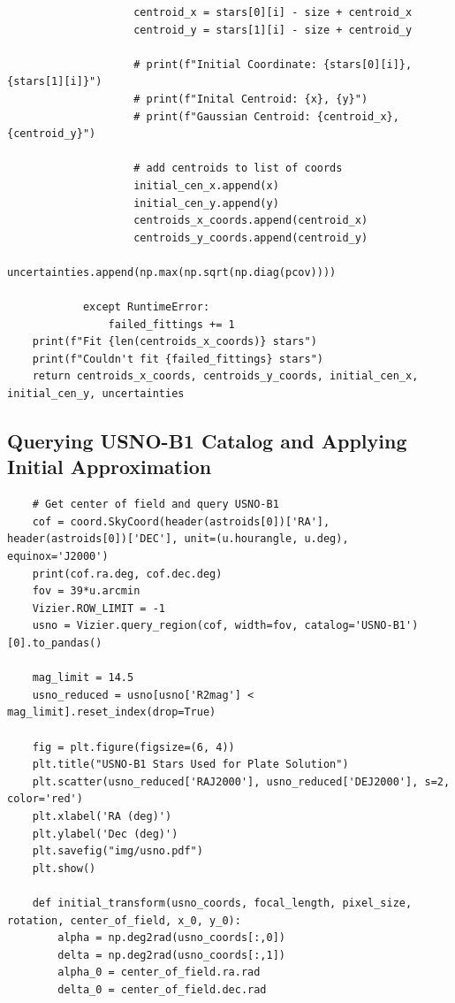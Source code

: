 \documentclass{article}
\begin{document}
\begin{appendices}
\begin{small}
\begin{verbatim}
                    centroid_x = stars[0][i] - size + centroid_x
                    centroid_y = stars[1][i] - size + centroid_y
                    
                    # print(f"Initial Coordinate: {stars[0][i]}, {stars[1][i]}")
                    # print(f"Inital Centroid: {x}, {y}")
                    # print(f"Gaussian Centroid: {centroid_x}, {centroid_y}")
                    
                    # add centroids to list of coords
                    initial_cen_x.append(x)
                    initial_cen_y.append(y)
                    centroids_x_coords.append(centroid_x)
                    centroids_y_coords.append(centroid_y)
                    uncertainties.append(np.max(np.sqrt(np.diag(pcov))))
                
            except RuntimeError:
                failed_fittings += 1
    print(f"Fit {len(centroids_x_coords)} stars")
    print(f"Couldn't fit {failed_fittings} stars")
    return centroids_x_coords, centroids_y_coords, initial_cen_x, initial_cen_y, uncertainties
\end{verbatim}
\end{small}
\subsection{Querying USNO-B1 Catalog and Applying Initial Approximation}

\begin{small}
\begin{verbatim}
    # Get center of field and query USNO-B1
    cof = coord.SkyCoord(header(astroids[0])['RA'], header(astroids[0])['DEC'], unit=(u.hourangle, u.deg), equinox='J2000')
    print(cof.ra.deg, cof.dec.deg)
    fov = 39*u.arcmin
    Vizier.ROW_LIMIT = -1
    usno = Vizier.query_region(cof, width=fov, catalog='USNO-B1')[0].to_pandas()
    
    mag_limit = 14.5
    usno_reduced = usno[usno['R2mag'] < mag_limit].reset_index(drop=True)
    
    fig = plt.figure(figsize=(6, 4)) 
    plt.title("USNO-B1 Stars Used for Plate Solution")      
    plt.scatter(usno_reduced['RAJ2000'], usno_reduced['DEJ2000'], s=2, color='red')
    plt.xlabel('RA (deg)')
    plt.ylabel('Dec (deg)')
    plt.savefig("img/usno.pdf")
    plt.show()
    
    def initial_transform(usno_coords, focal_length, pixel_size, rotation, center_of_field, x_0, y_0):
        alpha = np.deg2rad(usno_coords[:,0])
        delta = np.deg2rad(usno_coords[:,1])
        alpha_0 = center_of_field.ra.rad
        delta_0 = center_of_field.dec.rad
        

\end{verbatim}
\end{small}
\end{appendices}
\end{document}
